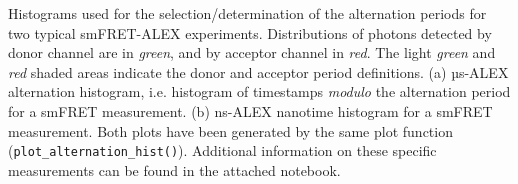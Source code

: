 \label{fig:altern_hist_double} 
Histograms used for the selection/determination of the alternation periods for two typical smFRET-ALEX experiments.
Distributions of photons detected by donor channel are in \textit{green}, and by acceptor channel in \textit{red}.
The light \textit{green} and \textit{red} shaded areas indicate the donor and acceptor period definitions.
(a) µs-ALEX alternation histogram, i.e. histogram of timestamps \textit{modulo} the alternation period for a smFRET measurement. 
(b) ns-ALEX nanotime histogram for a smFRET measurement. 
Both plots have been generated by the same plot function (\texttt{plot\_alternation\_hist()}). 
Additional information on these specific measurements can be found in the  attached notebook.
